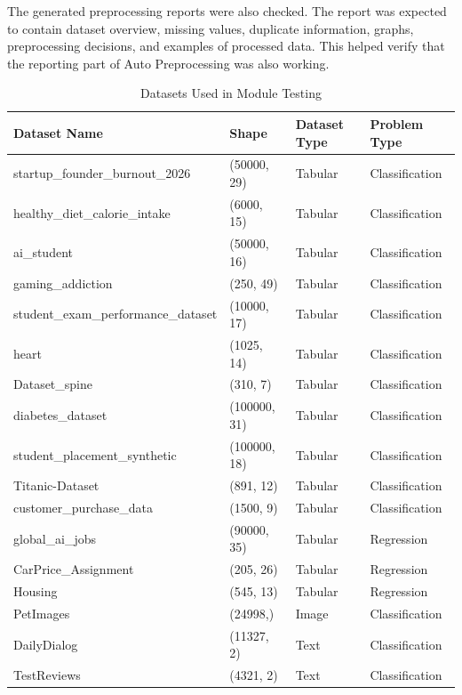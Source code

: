 \documentclass[12pt,a4paper]{report}
\begin{document}
The generated preprocessing reports were also checked. The report was expected
to contain dataset overview, missing values, duplicate information, graphs,
preprocessing decisions, and examples of processed data. This helped verify
that the reporting part of Auto Preprocessing was also working.

\begin{table}[!htbp]
\centering
\caption{Datasets Used in Module Testing}
\label{tab:module_testing_datasets}
\begin{tabular}{|p{7cm}|p{3cm}|p{3cm}|p{3cm}|}
\hline
\textbf{Dataset Name} & \textbf{Shape} & \textbf{Dataset Type} & \textbf{Problem Type} \\
\hline
startup\_founder\_burnout\_2026 & (50000, 29) & Tabular & Classification \\
\hline
healthy\_diet\_calorie\_intake & (6000, 15) & Tabular & Classification \\
\hline
ai\_student & (50000, 16) & Tabular & Classification \\
\hline
gaming\_addiction & (250, 49) & Tabular & Classification \\
\hline
student\_exam\_performance\_dataset & (10000, 17) & Tabular & Classification \\
\hline
heart & (1025, 14) & Tabular & Classification \\
\hline
Dataset\_spine & (310, 7) & Tabular & Classification \\
\hline
diabetes\_dataset & (100000, 31) & Tabular & Classification \\
\hline
student\_placement\_synthetic & (100000, 18) & Tabular & Classification \\
\hline
Titanic-Dataset & (891, 12) & Tabular & Classification \\
\hline
customer\_purchase\_data & (1500, 9) & Tabular & Classification \\
\hline
global\_ai\_jobs & (90000, 35) & Tabular & Regression \\
\hline
CarPrice\_Assignment & (205, 26) & Tabular & Regression \\
\hline
Housing & (545, 13) & Tabular & Regression \\
\hline
PetImages & (24998,) & Image & Classification \\
\hline
DailyDialog & (11327, 2) & Text & Classification \\
\hline
TestReviews & (4321, 2) & Text & Classification \\
\hline
\end{tabular}
\end{table}
\end{document}
